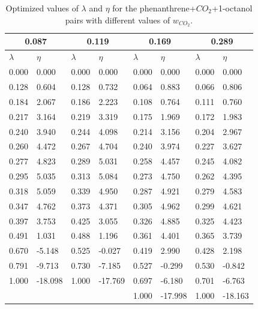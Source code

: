 \begin{table}[h]
	\centering
	\caption{Optimized values of $\lambda $ and $\eta $ for the phenanthrene+$CO_{2}$+1-octanol pairs with different values of $w_{CO_{2}}$.}
	\begin{tabular}{llllllll}
		\hline
		\multicolumn{2}{c}{0.087}& \multicolumn{2}{c}{0.119}& \multicolumn{2}{c}{0.169}& \multicolumn{2}{c}{0.289}\\
		\hline\hline
		$\lambda$ & $\eta$ & $\lambda$ & $\eta$  & $\lambda$ & $\eta$  & $\lambda$ & $\eta$ \\ 
		\hline\hline
		0.000	&	0.000	&	0.000	&	0.000	&	0.000	&	0.000	&	0.000	&	0.000	\\
		0.128	&	0.604	&	0.128	&	0.732	&	0.064	&	0.883	&	0.066	&	0.806	\\
		0.184	&	2.067	&	0.186	&	2.223	&	0.108	&	0.764	&	0.111	&	0.760	\\
		0.217	&	3.164	&	0.219	&	3.319	&	0.175	&	1.969	&	0.172	&	1.983	\\
		0.240	&	3.940	&	0.244	&	4.098	&	0.214	&	3.156	&	0.204	&	2.967	\\
		0.260	&	4.472	&	0.267	&	4.704	&	0.240	&	3.974	&	0.227	&	3.627	\\
		0.277	&	4.823	&	0.289	&	5.031	&	0.258	&	4.457	&	0.245	&	4.082	\\
		0.295	&	5.035	&	0.313	&	5.084	&	0.273	&	4.750	&	0.262	&	4.395	\\
		0.318	&	5.059	&	0.339	&	4.950	&	0.287	&	4.921	&	0.279	&	4.583	\\
		0.347	&	4.762	&	0.373	&	4.371	&	0.305	&	4.962	&	0.299	&	4.621	\\
		0.397	&	3.753	&	0.425	&	3.055	&	0.326	&	4.885	&	0.325	&	4.423	\\
		0.491	&	1.031	&	0.488	&	1.196	&	0.361	&	4.401	&	0.365	&	3.739	\\
		0.670	&	-5.148	&	0.525	&	-0.027	&	0.419	&	2.990	&	0.428	&	2.198	\\
		0.791	&	-9.713	&	0.730	&	-7.185	&	0.527	&	-0.299	&	0.530	&	-0.842	\\
		1.000	&	-18.098	&	1.000	&	-17.769	&	0.697	&	-6.180	&	0.701	&	-6.763	\\
		&		&		&		&	1.000	&	-17.998	&	1.000	&	-18.163	\\
		\hline\hline
	\end{tabular}
\end{table}
\FloatBarrier
